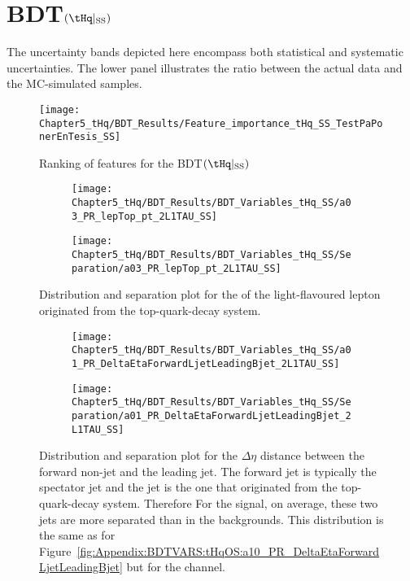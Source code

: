 \FloatBarrier

\section{BDT$(\tHq|_{\text{SS}})$}
\label{chap:Appendix:BDT_Variables:SS_tHq}
The uncertainty bands depicted here encompass both statistical and systematic uncertainties. 
The lower panel illustrates the ratio between the actual data and the MC-simulated samples.



\begin{figure}[h]
  \centering
  \texttt{[image: Chapter5\_tHq/BDT\_Results/Feature\_importance\_tHq\_SS\_TestPaPonerEnTesis\_SS]}
\caption{Ranking of features for the BDT$(\tHq|_{\text{SS}})$ }
\label{fig:Appendix:BDTVARS:tHqOS:Feature_importance_tHq_SS}
\end{figure}


\begin{figure}[h]
\centering
\begin{subfigure}{.45\textwidth}
  \centering
  \texttt{[image: Chapter5\_tHq/BDT\_Results/BDT\_Variables\_tHq\_SS/a03\_PR\_lepTop\_pt\_2L1TAU\_SS]}
\end{subfigure}%
\begin{subfigure}{.55\textwidth}
  \centering
  \texttt{[image: Chapter5\_tHq/BDT\_Results/BDT\_Variables\_tHq\_SS/Separation/a03\_PR\_lepTop\_pt\_2L1TAU\_SS]}
\end{subfigure}
\caption{Distribution and separation plot for the \pT of the light-flavoured lepton originated from the top-quark-decay system.}
\label{fig:Appendix:BDTVARS:tHqSS:a03_PR_lepTop_pt}
\end{figure}


\begin{figure}[h]
\centering
\begin{subfigure}{.45\textwidth}
  \centering
  \texttt{[image: Chapter5\_tHq/BDT\_Results/BDT\_Variables\_tHq\_SS/a01\_PR\_DeltaEtaForwardLjetLeadingBjet\_2L1TAU\_SS]}
\end{subfigure}%
\begin{subfigure}{.55\textwidth}
  \centering
  \texttt{[image: Chapter5\_tHq/BDT\_Results/BDT\_Variables\_tHq\_SS/Separation/a01\_PR\_DeltaEtaForwardLjetLeadingBjet\_2L1TAU\_SS]}
\end{subfigure}
\caption{Distribution and separation plot for the $\Delta \eta$ distance between the forward non-\btagged jet
and the leading \btagged jet. The forward jet is typically the spectator jet and the \btagged jet is the one that originated
from the top-quark-decay system. Therefore 
For the \tHq signal, on average, these two jets are more separated than in the backgrounds.
This distribution is the same as 
for Figure~\ref{fig:Appendix:BDTVARS:tHqOS:a10_PR_DeltaEtaForwardLjetLeadingBjet} but for
the \dilepSStau channel.}
\label{fig:Appendix:BDTVARS:tHqSS:a01_PR_DeltaEtaForwardLjetLeadingBjet}
\end{figure}



